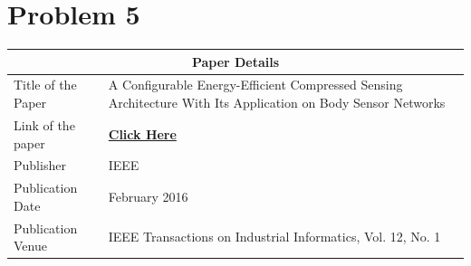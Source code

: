\documentclass[a4paper,11pt]{article}
\numberwithin{definition}{section}
\numberwithin{mytheorem}{subsection}
\begin{document}
\newpage
\newpage
\section{Problem 5}
\begin{center}
    \begin{tabular}{ |p{4cm}||p{12cm}|}
   
    \hline
    \multicolumn{2}{|c|}{Paper Details} \\
    \hline
    Title of the Paper& A Configurable Energy-Efficient Compressed
    Sensing Architecture With Its Application
    on Body Sensor Networks\\
    \hline
    Link of the paper  &  \href{https://ieeexplore.ieee.org/stamp/stamp.jsp?tp=\&arnumber=7279137\&tag=1}{\textbf{Click Here}}  \\
    \hline
    Publisher & IEEE \\
    \hline
    Publication Date   &  February 2016 \\
    \hline
    Publication Venue  & IEEE Transactions on Industrial Informatics, Vol. 12, No. 1 \\
    \hline
    
    
   \end{tabular}
\end{center}
\end{document}
